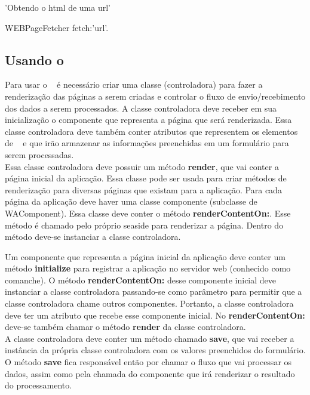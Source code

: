 \begin{godCode}
'Obtendo o html de uma url'

WEBPageFetcher fetch:'url'.

\end{godCode}



\subsection{Usando o \godweb}
Para usar o \godweb~ é necessário criar uma classe (controladora) para fazer a renderização das páginas a serem criadas e controlar o fluxo de envio/recebimento dos dados a 
serem processados. A classe controladora deve receber em sua inicialização o componente que representa a página que será renderizada.
Essa classe controladora deve também conter atributos que representem os elementos de \godweb~ e que irão armazenar as informações preenchidas em um formulário para serem processadas.\\

Essa classe controladora deve possuir um método \textbf{render}, que vai conter a página inicial da aplicação. Essa classe pode ser usada para criar métodos de renderização para 
diversas páginas que existam para a aplicação. Para cada página da aplicação deve haver uma classe componente (subclasse de WAComponent). Essa classe deve conter o método 
\textbf{renderContentOn:}. Esse método é chamado pelo próprio seaside para renderizar a página. Dentro do método deve-se instanciar a classe controladora.

Um componente que representa a página inicial da aplicação deve conter um método \textbf{initialize} para registrar a aplicação no servidor web (conhecido como comanche).
O método \textbf{renderContentOn:} desse componente inicial deve instanciar a classe controladora passando-se como parâmetro para permitir que a classe controladora chame 
outros componentes. Portanto, a classe controladora deve ter um atributo que recebe esse componente inicial. No \textbf{renderContentOn:} deve-se também chamar o método 
\textbf{render} da classe controladora.\\

A classe controladora deve conter um método chamado \textbf{save},  que vai receber a instância da própria classe controladora com os valores preenchidos do formulário. 
O método \textbf{save} fica responsável então por chamar o fluxo que vai processar os dados, assim como pela chamada do componente que irá renderizar o resultado do processamento.\\

